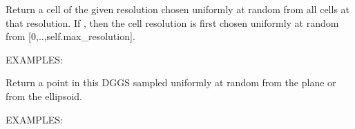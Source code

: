 \documentclass[a4paper,12ptopenany,oneside,english]{sphinxmanual}
\begin{document}
\begin{fulllineitems}

\begin{fulllineitems}
\label{\detokenize{dggs:rhealpixdggs.dggs.RHEALPixDGGS.random_cell}}
\pysigstartsignatures
\pysiglinewithargsret
{}
{}
{}
\pysigstopsignatures
\sphinxAtStartPar
Return a cell of the given resolution chosen uniformly at random
from all cells at that resolution.
If , then the cell resolution is first chosen
uniformly at random from {[}0,..,self.max\_resolution{]}.

\sphinxAtStartPar
EXAMPLES:

\begin{sphinxVerbatim}[commandchars=\\\{\}]
\end{sphinxVerbatim}

\end{fulllineitems}


\begin{fulllineitems}
\label{\detokenize{dggs:rhealpixdggs.dggs.RHEALPixDGGS.random_point}}
\pysigstartsignatures
\pysiglinewithargsret
{}
{}
{}
\pysigstopsignatures
\sphinxAtStartPar
Return a point in this DGGS sampled uniformly at
random from the plane or from the ellipsoid.

\sphinxAtStartPar
EXAMPLES:

\begin{sphinxVerbatim}[commandchars=\\\{\}]
  
\end{sphinxVerbatim}


\end{fulllineitems}
\end{fulllineitems}
\end{document}
